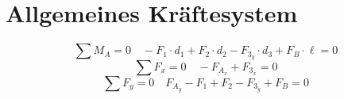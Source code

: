 



\section{Allgemeines Kräftesystem}
\[ \sum M_A = 0 \quad -F_1 \cdot d_1 + F_2 \cdot d_2 - F_{3_y} \cdot d_3 + F_B \cdot \ell = 0 \]
\[ \sum F_x = 0 \quad -F_{A_x} + F_{3_x} = 0 \]
\[ \sum F_y = 0 \quad F_{A_y} - F_1 + F_2 - F_{3_y} + F_B = 0 \]